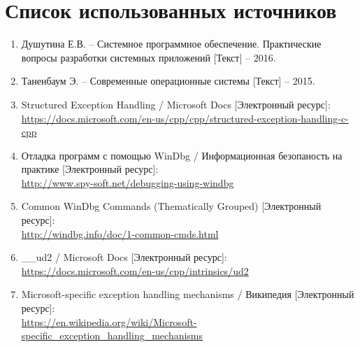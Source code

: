 \newpage

\section*{Список использованных источников}

\begin{enumerate}
	\item Душутина Е.В. -- Системное программное обеспечение. Практические вопросы разработки системных приложений [Текст] -- 2016.
	\item Таненбаум Э. -- Современные операционные системы [Текст] -- 2015.
	\item Structured Exception Handling / Microsoft Docs [Электронный ресурс]:\\
		{\small\url{https://docs.microsoft.com/en-us/cpp/cpp/structured-exception-handling-c-cpp}}
	\item Отладка программ с помощью WinDbg / Информационная безопаность на практике [Электронный ресурс]:\\
		{\small\url{http://www.spy-soft.net/debugging-using-windbg}}
	\item Common WinDbg Commands (Thematically Grouped) [Электронный ресурс]:\\
		{\small\url{http://windbg.info/doc/1-common-cmds.html}}
	\item \_\_ud2 / Microsoft Docs [Электронный ресурс]:\\
		{\small\url{https://docs.microsoft.com/en-us/cpp/intrinsics/ud2}}
	\item Microsoft-specific exception handling mechanisms / Википедия [Электронный ресурс]:\\
		{\small\url{https://en.wikipedia.org/wiki/Microsoft-specific_exception_handling_mechanisms}}
\end{enumerate}



